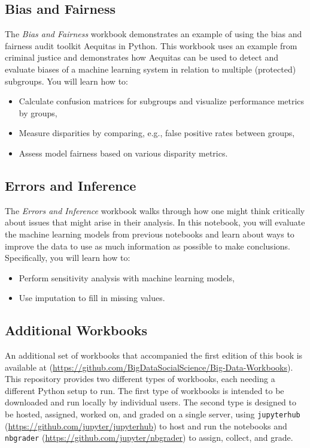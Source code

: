 \documentclass[]{krantz}
\begin{document}
\subsection{Bias and Fairness}\label{bias-and-fairness}

The \emph{Bias and Fairness} workbook demonstrates an example of using
the bias and fairness audit toolkit Aequitas in Python. This workbook
uses an example from criminal justice and demonstrates how Aequitas can
be used to detect and evaluate biases of a machine learning system in
relation to multiple (protected) subgroups. You will learn how to:

\begin{itemize}
\item
  Calculate confusion matrices for subgroups and visualize performance
  metrics by groups,
\item
  Measure disparities by comparing, e.g., false positive rates between
  groups,
\item
  Assess model fairness based on various disparity metrics.
\end{itemize}

\subsection{Errors and Inference}\label{errors-and-inference}

The \emph{Errors and Inference} workbook walks through how one might
think critically about issues that might arise in their analysis. In
this notebook, you will evaluate the machine learning models from
previous notebooks and learn about ways to improve the data to use as
much information as possible to make conclusions. Specifically, you will
learn how to:

\begin{itemize}
\item
  Perform sensitivity analysis with machine learning models,
\item
  Use imputation to fill in missing values.
\end{itemize}

\subsection{Additional Workbooks}\label{additional-workbooks}

An additional set of workbooks that accompanied the first edition of
this book is available at
(\url{https://github.com/BigDataSocialScience/Big-Data-Workbooks}). This
repository provides two different types of workbooks, each needing a
different Python setup to run. The first type of workbooks is intended
to be downloaded and run locally by individual users. The second type is
designed to be hosted, assigned, worked on, and graded on a single
server, using \texttt{jupyterhub}
(\url{https://github.com/jupyter/jupyterhub}) to host and run the
notebooks and \texttt{nbgrader}
(\url{https://github.com/jupyter/nbgrader}) to assign, collect, and
grade.
\end{document}
